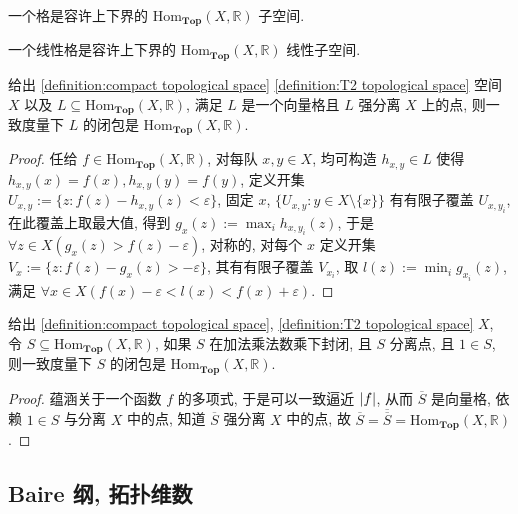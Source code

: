 \begin{definition}
    一个格是容许上下界的 \(\mathrm{Hom}_{\mathbf{Top}} (X,\mathbb{R})\) 子空间.

    一个线性格是容许上下界的 \(\mathrm{Hom}_{\mathbf{Top}} (X,\mathbb{R})\) 线性子空间.
\end{definition}

\begin{theorem}
    给出 \ref{definition:compact topological space} \ref{definition:T2 topological space} 空间 \(X\) 以及 \(L \subseteq \mathrm{Hom}_{\mathbf{Top}} (X,\mathbb{R})\),
    满足 \(L\) 是一个向量格且 \(L\) 强分离 \(X\) 上的点, 则一致度量下 \(L\) 的闭包是 \(\mathrm{Hom}_{\mathbf{Top}} (X,\mathbb{R})\).

    \begin{proof}
        任给 \(f \in \mathrm{Hom}_{\mathbf{Top}} (X,\mathbb{R})\), 对每队 \(x,y \in X\), 均可构造 \(h_{x,y} \in L\) 使得
        \(h_{x,y} (x) = f(x),h_{x,y} (y) = f(y)\), 定义开集 \(U_{x,y} := \{z : f(z) - h_{x,y} (z) < \varepsilon\}\), 固定 \(x\), \(\{U_{x,y} : y \in X \setminus \{x\}\}\) 有有限子覆盖
        \(U_{x,y_i}\), 在此覆盖上取最大值, 得到 \(g_x (z) := \max_i h_{x,y_i} (z)\), 于是 \(\forall z \in X (g_x(z) > f(z) - \varepsilon)\),
        对称的, 对每个 \(x\) 定义开集 \(V_x := \{z : f(z) - g_x (z) > -\varepsilon\}\), 其有有限子覆盖 \(V_{x_i}\), 取 \(l(z) := \min_i g_{x_i} (z)\),
        满足 \(\forall x \in X (f(x) - \varepsilon < l(x) < f(x) + \varepsilon)\).
    \end{proof}
\end{theorem}

\begin{theorem}
    给出 \ref{definition:compact topological space}, \ref{definition:T2 topological space} \(X\), 令 \(S \subseteq \mathrm{Hom}_{\mathbf{Top}} (X,\mathbb{R})\),
    如果 \(S\) 在加法乘法数乘下封闭, 且 \(S\) 分离点, 且 \(1 \in S\), 则一致度量下 \(S\) 的闭包是 \(\mathrm{Hom}_{\mathbf{Top}} (X,\mathbb{R})\).

    \begin{proof}
        蕴涵关于一个函数 \(f\) 的多项式, 于是可以一致逼近 \(\abs{f}\), 从而 \(\overline{S}\) 是向量格,
        依赖 \(1 \in S\) 与分离 \(X\) 中的点, 知道 \(\overline{S}\) 强分离 \(X\) 中的点,
        故 \(\overline{S} = \overline{\overline{S}} = \mathrm{Hom}_{\mathbf{Top}} (X,\mathbb{R})\).
    \end{proof}
\end{theorem}

\subsection{Baire 纲, 拓扑维数}


